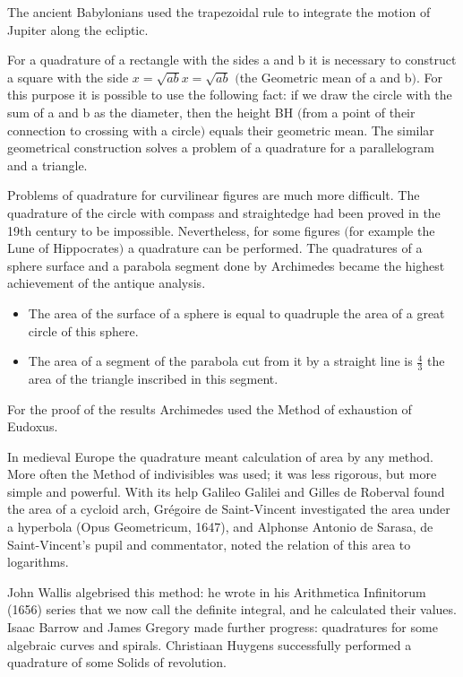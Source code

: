 \documentclass[a4paper,12pt]{report}
\numberwithin{equation}{section}
\begin{document}
The ancient Babylonians used the trapezoidal rule to integrate the motion of Jupiter along the ecliptic.

For a quadrature of a rectangle with the sides a and b it is necessary to construct a square with the side ${\displaystyle x={\sqrt {ab}}} x={\sqrt {ab}}$ $($the Geometric mean of a and b$)$. For this purpose it is possible to use the following fact: if we draw the circle with the sum of a and b as the diameter, then the height BH $($from a point of their connection to crossing with a circle$)$ equals their geometric mean. The similar geometrical construction solves a problem of a quadrature for a parallelogram and a triangle.

Problems of quadrature for curvilinear figures are much more difficult. The quadrature of the circle with compass and straightedge had been proved in the 19th century to be impossible. Nevertheless, for some figures $($for example the Lune of Hippocrates$)$ a quadrature can be performed. The quadratures of a sphere surface and a parabola segment done by Archimedes became the highest achievement of the antique analysis.
\begin{itemize}
	\item The area of the surface of a sphere is equal to quadruple the area of a great circle of this sphere.
  \item The area of a segment of the parabola cut from it by a straight line is $\frac{4}{3}$ the area of the triangle inscribed in this segment.
\end{itemize}
For the proof of the results Archimedes used the Method of exhaustion of Eudoxus.

In medieval Europe the quadrature meant calculation of area by any method. More often the Method of indivisibles was used; it was less rigorous, but more simple and powerful. With its help Galileo Galilei and Gilles de Roberval found the area of a cycloid arch, Grégoire de Saint-Vincent investigated the area under a hyperbola (Opus Geometricum, 1647), and Alphonse Antonio de Sarasa, de Saint-Vincent's pupil and commentator, noted the relation of this area to logarithms.

John Wallis algebrised this method: he wrote in his Arithmetica Infinitorum (1656) series that we now call the definite integral, and he calculated their values. Isaac Barrow and James Gregory made further progress: quadratures for some algebraic curves and spirals. Christiaan Huygens successfully performed a quadrature of some Solids of revolution.
\end{document}
